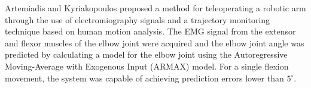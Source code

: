 \documentclass[letterpaper, 10 pt, conference]{ieeeconf}  %
\begin{document}
% 
% 




Artemiadis and Kyriakopoulos \cite{Artemiadis1642196} proposed a method for teleoperating a robotic arm through the use of electromiography signals and a trajectory monitoring technique based on human motion analysis. The EMG signal from the extensor and flexor muscles of the elbow joint were acquired and the elbow joint angle was predicted by calculating a model for the elbow joint using the Autoregressive Moving-Average with Exogenous Input (ARMAX) model. 
For a single flexion movement, the system was capable of achieving prediction errors lower than \(5^{\circ}\).

\end{document}

